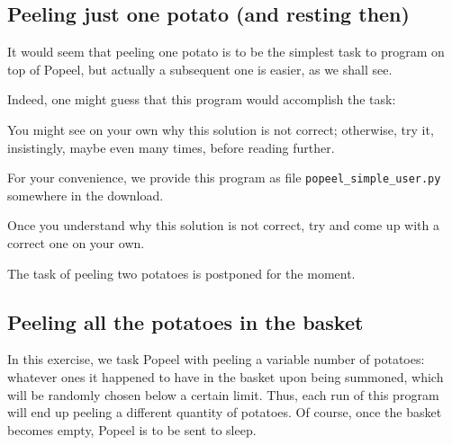 \documentclass[12pt]{article}
\begin{document}
\subsection{Peeling just one potato (and resting then)}

It would seem that peeling one potato is to be
the simplest task to program on top of Popeel,
but actually a subsequent one is easier, as we
shall see.








Indeed, one might guess that this program would
accomplish the task:




You might see on your own why this solution is not correct; 
otherwise, try it, insistingly, maybe even many times, 
before reading further. 

For your convenience, we provide 
this program as file 
{\tt popeel_simple_user.py} somewhere in the download.

%
Once you understand why this solution is not
correct, try and come up with a correct one
on your own. 

The task of peeling two potatoes is postponed for the moment.

\subsection{Peeling all the potatoes in the basket}

In this exercise, we task Popeel with peeling a
variable number of potatoes: whatever ones it 
happened to have in the basket upon being summoned,
which will be randomly chosen below a certain limit.
Thus, each run of this program will end up peeling a 
different quantity of potatoes. Of course, once the
basket becomes empty, Popeel is to be sent to sleep.
\end{document}
